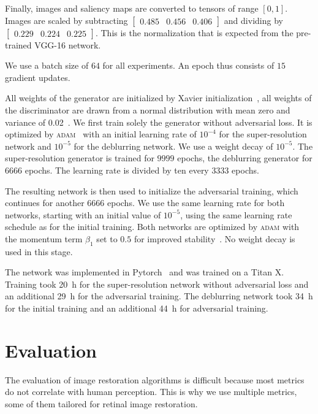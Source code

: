\documentclass{scrartcl}
\begin{document}
Finally, images and saliency maps are converted to tensors of range $[0,1]$.
Images are scaled by subtracting
\(
\begin{bmatrix}
 0.485 & 0.456 & 0.406 
\end{bmatrix}
\)
and dividing by
\(
\begin{bmatrix}
0.229 & 0.224& 0.225
\end{bmatrix}
\).
This is the normalization that is expected from the pre-trained VGG-16 network.

We use a batch size of $64$ for all experiments.
An epoch thus consists of $15$ gradient updates.

All weights of the generator are initialized by Xavier initialization~\cite{Xavier}, all weights of the discriminator are drawn from a normal distribution with mean zero and variance of 0.02~\cite{PatchGAN}. 
We first train solely the generator without adversarial loss.
It is optimized by \textsc{adam}~\cite{Adam} with an initial learning rate of $10^{-4}$ for the super-resolution network and $10^{-5}$ for the deblurring network.
We use a weight decay of $10^{-5}$.
The super-resolution generator is trained for $9999$ epochs, the deblurring generator for $6666$ epochs.
The learning rate is divided by ten every $3333$ epochs.

The resulting network is then used to initialize the adversarial training, which continues for another $6666$ epochs.
We use the same learning rate for both networks, starting with an initial value of $10^{-5}$, using the same learning rate schedule as for the initial training.
Both networks are optimized by \textsc{adam} with the momentum term $\beta_1$ set to $0.5$ for improved stability~\cite{Dcgan}.
No weight decay is used in this stage.

The network was implemented in Pytorch~\cite{Pytorch} and was trained on a Titan X.
Training took \SI{20}{\hour} for the super-resolution network without adversarial loss and an additional \SI{29}{\hour} for the adversarial training.
The deblurring network took \SI{34}{\hour} for the initial training and an additional \SI{44}{\hour} for adversarial training.

\section{Evaluation}
The evaluation of image restoration algorithms is difficult because most metrics do not correlate with human perception.
This is why we use multiple metrics, some of them tailored for retinal image restoration.
\end{document}
